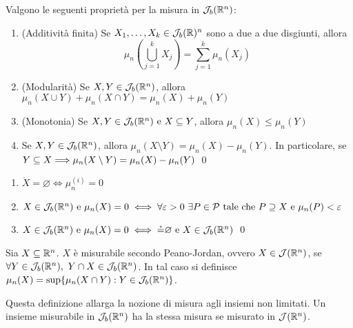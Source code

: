 \begin{theorem}
    Valgono le seguenti proprietà per la misura in $\mathcal{J}_b(\mathbb{R}^n)$:
    \begin{enumerate}
        \item (Additività finita) Se $X_1,\dots,X_k \in \mathcal{J}_b(\mathbb{R})^n$ sono a due a due disgiunti, allora
        \begin{equation*}
            \mu_n\left(\displaystyle \bigcup_{j=1}^kX_j\right) =   \displaystyle\sum_{j=1}^k\mu_n(X_j)
        \end{equation*}
        \item (Modularità) Se $X,Y \in \mathcal{J}_b(\mathbb{R}^n)$, allora $\mu_n(X\cup Y)+\mu_n(X\cap Y)=\mu_n(X)+\mu_n(Y)$
        \item (Monotonia) Se $X,Y \in \mathcal{J}_b(\mathbb{R}^n) \text{ e } X \subseteq Y$, allora $\mu_n(X) \leq \mu_n(Y)$
        \item Se $X,Y \in \mathcal{J}_b(\mathbb{R}^n)$, allora $\mu_n(X\setminus Y)=\mu_n(X)-\mu_n(Y)$. In particolare, se $Y \subseteq X \Longrightarrow \mu_n (X \setminus Y)=\mu_n(X)-\mu_n(Y)$
        \qed
    \end{enumerate}
\end{theorem}

\begin{theorem}
    \leavevmode
    \begin{enumerate}
        \item $\mathring X = \varnothing \iff \mu_n^{(i)}=0$
        \item $X \in \mathcal{J}_b(\mathbb{R}^n) \text{ e } \mu_n(X)=0 \iff \forall \varepsilon >0 \ \exists P \in \mathcal{P} \text{ tale che } P \supseteq X \text{ e } \mu_n(P)< \varepsilon$
        \item $X \in \mathcal{J}_b(\mathbb{R}^n) \text{ e } \mu_n(X)=0 \iff \mathring = \varnothing \text{ e } X \in \mathcal{J}_b(\mathbb{R}^n)$
        \qed
    \end{enumerate}
\end{theorem}

\begin{definition}
    Sia $X\subseteq \mathbb{R}^n$. $X$ è misurabile secondo Peano-Jordan, ovvero $X \in \mathcal{J}(\mathbb{R}^n)$, se $\forall Y \in \mathcal{J}_b(\mathbb{R}^n), \ Y \cap X \in \mathcal{J}_b(\mathbb{R}^n)$. In tal caso si definisce $\mu_n(X)=\sup\{\mu_n(X\cap Y):Y\in \mathcal{J}_b(\mathbb{R}^n)\}$.
\end{definition}

\begin{remark}
    Questa definizione allarga la nozione di misura agli insiemi non limitati. Un insieme misurabile in $\mathcal{J}_b(\mathbb{R}^n)$ ha la stessa misura se misurato in $\mathcal{J}(\mathbb{R}^n)$.
\end{remark}

